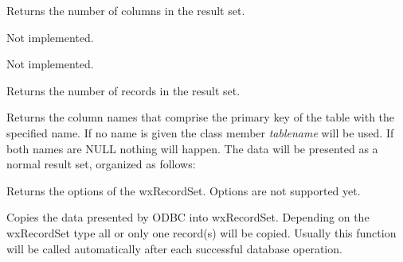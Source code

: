
Returns the number of columns in the result set.
  


Not implemented.



Not implemented.



Returns the number of records in the result set.
  


Returns the column names that comprise the primary key of the table with the specified name. If no name is
given the class member {\it tablename} will be used. If both names are NULL
nothing will happen. The data will be presented as a normal result set, organized
as follows:

\begin{twocollist}\itemsep=0pt
\end{twocollist}



Returns the options of the wxRecordSet. Options are not supported yet.



Copies the data presented by ODBC into wxRecordSet. Depending on the
wxRecordSet type all or only one record(s) will be copied.
Usually this function will be called automatically after each successful
database operation.
  


